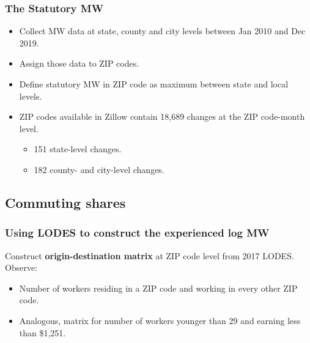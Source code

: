 \documentclass[aspectratio=169]{beamer}
\begin{document}
\begin{frame}[label=stat_MW]
	\frametitle{The Statutory MW}
	
	\begin{itemize}
		\item
		Collect MW data at state, county and city levels between Jan 2010 and Dec 2019.
		
		\vspace{2mm} \item
		Assign those data to ZIP codes.
		
		\vspace{2mm} \item
		Define statutory MW in ZIP code as maximum between state and local levels.
		
		\pause
		\vspace{2mm} \item
		ZIP codes available in Zillow contain 18,689 changes at the ZIP code-month level.
		\vspace{-3.5mm} 
		\begin{itemize} \small
			\item 151 state-level changes.
			\item 182 county- and city-level changes.
		\end{itemize}
		
	\end{itemize}
	
\end{frame}

\subsection{Commuting shares}

\begin{frame}
	\frametitle{Using LODES to construct the experienced log MW}
	
	Construct \textbf{origin-destination matrix} at ZIP code level from 2017 LODES.
	Observe:
	\begin{itemize} \small
		\item Number of workers residing in a ZIP code and working in every other 
		ZIP code.
		\item Analogous, matrix for number of workers younger than 29 and earning less than 
		\$1,251.
	\end{itemize}
\end{frame}
\end{document}

